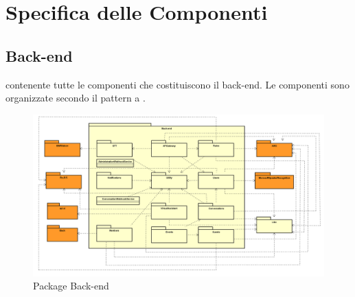 \section{Specifica delle Componenti}
\subsection{Back-end}
 contenente tutte le componenti che costituiscono il back-end. Le componenti sono organizzate secondo il pattern a .
\begin{figure}[h] \centering \includegraphics[width=\textwidth,height=\textheight,keepaspectratio]{images/diagrams/back-end/Official_Backend_0304/Back-end.png}
	\caption{Package Back-end}
\end{figure}
\newpage
